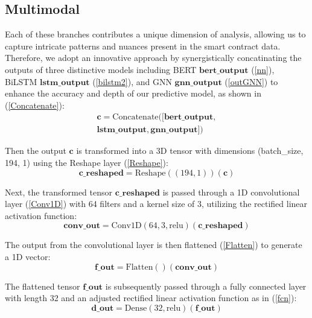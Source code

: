 \subsection{Multimodal}
Each of these branches contributes a unique dimension of analysis, allowing us to capture intricate patterns and nuances present in the smart contract data. Therefore, we adopt an innovative approach by synergistically concatinating the outputs of three distinctive models including BERT $\mathbf{bert\_output}$ (\ref{nn}), BiLSTM $\mathbf{lstm\_output}$ (\ref{bilstm2}), and GNN $\mathbf{gnn\_output}$ (\ref{outGNN}) to enhance the accuracy and depth of our predictive model, as shown in (\ref{Concatenate}):
\begin{equation}
\begin{split}
   \mathbf{c} = \mathrm{Concatenate}([\mathbf{bert\_output}, \\\mathbf{lstm\_output}, \mathbf{gnn\_output}])
    \label{Concatenate}
\end{split}
\end{equation}

Then the output $\mathbf{c}$ is transformed into a 3D tensor with dimensions (batch\_size, 194, 1) using the Reshape layer (\ref{Reshape}):
\begin{equation}
    \mathbf{c\_reshaped} = \mathrm{Reshape}((194, 1))(\mathbf{c})\label{Reshape}
\end{equation}

Next, the transformed tensor $\mathbf{c\_reshaped}$ is passed through a 1D convolutional layer (\ref{Conv1D}) with 64 filters and a kernel size of 3, utilizing the rectified linear activation function:
\begin{equation}
    \mathbf{conv\_out} = \mathrm{Conv1D}(64, 3, \mathrm{relu})(\mathbf{c\_reshaped}) \label{Conv1D}
\end{equation}

The output from the convolutional layer is then flattened (\ref{Flatten}) to generate a 1D vector:
\begin{equation}
    \mathbf{f\_out} = \mathrm{Flatten}()(\mathbf{conv\_out}) \label{Flatten}
\end{equation}

The flattened tensor $\mathbf{f\_out}$ is subsequently passed through a fully connected layer with length 32 and an adjusted rectified linear activation function as in (\ref{fcn}):
\begin{equation}
 \mathbf{d\_out} = \mathrm{Dense}(32, \mathrm{relu})(\mathbf{f\_out}) \label{fcn}
\end{equation}

